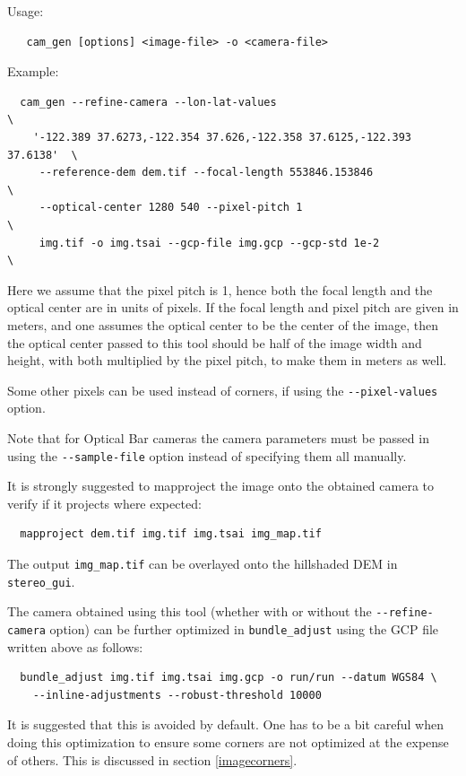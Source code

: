 Usage:
\begin{verbatim}
   cam_gen [options] <image-file> -o <camera-file>
\end{verbatim}

Example:
\begin{verbatim}
  cam_gen --refine-camera --lon-lat-values                                \
    '-122.389 37.6273,-122.354 37.626,-122.358 37.6125,-122.393 37.6138'  \
     --reference-dem dem.tif --focal-length 553846.153846                 \
     --optical-center 1280 540 --pixel-pitch 1                            \
     img.tif -o img.tsai --gcp-file img.gcp --gcp-std 1e-2                \
\end{verbatim} %

Here we assume that the pixel pitch is 1, hence both the focal length and the optical
center are in units of pixels. If the focal length and pixel pitch are given in meters,
and one assumes the optical center to be the center of the image, then the optical
center passed to this tool should be half of the image width and height, with both
multiplied by the pixel pitch, to make them in meters as well. 

Some other pixels can be used instead of corners, if using the \texttt{-\/-pixel-values}
option.

Note that for Optical Bar cameras the camera parameters must be passed in using the 
\texttt{-\/-sample-file} option instead of specifying them all manually.

It is strongly suggested to mapproject the image onto the obtained camera to verify
if it projects where expected:
\begin{verbatim}
  mapproject dem.tif img.tif img.tsai img_map.tif
\end{verbatim}

The output \texttt{img\_map.tif} can be overlayed onto the hillshaded DEM in 
\texttt{stereo\_gui}.

The camera obtained using this tool (whether with or without the
\texttt{-\/-refine-camera} option) can be further optimized in
\texttt{bundle\_adjust} using the GCP file written above as follows:

\begin{verbatim}
  bundle_adjust img.tif img.tsai img.gcp -o run/run --datum WGS84 \
    --inline-adjustments --robust-threshold 10000
\end{verbatim}

It is suggested that this is avoided by default. One has to be a bit
careful when doing this optimization to ensure some corners are not
optimized at the expense of others. This is discussed in section
\ref{imagecorners}.

